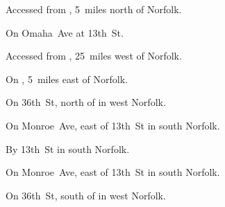 
\begin{LocationList}

Accessed from , 5~miles north of Norfolk.

On  Omaha~Ave at  13th~St.

Accessed from , 25~miles west of Norfolk.

On , 5~miles east of Norfolk.

On 36th~St, north of  in west Norfolk.

\Location{\TruckService \Service}
On Monroe~Ave, east of  13th~St in south Norfolk.

\Location{\TruckStop \Gas \Rest \Weigh}
By  13th~St in south Norfolk.

On Monroe~Ave, east of  13th~St in south Norfolk.

On 36th~St, south of  in west Norfolk.

\end{LocationList}
